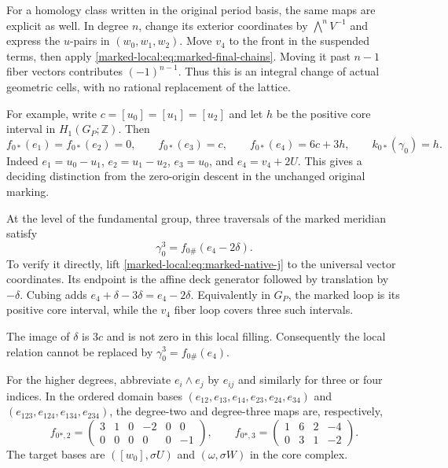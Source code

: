For a homology class written in the original period basis, the
same maps are explicit as well. In degree $n$, change its exterior coordinates by $\bigwedge^nV^{-1}$
and express the $u$-pairs in $(w_0,w_1,w_2)$.
Move $v_4$ to the front in the suspended terms, then apply
\eqref{marked-local:eq:marked-final-chains}. Moving it
past $n-1$ fiber vectors contributes $(-1)^{n-1}$.
Thus this is an integral change of actual geometric
cells, with no rational replacement of the lattice.

For example, write $c=[u_0]=[u_1]=[u_2]$ and let $h$ be the
positive core interval in $H_1(G_P;\mathbb Z)$. Then
\begin{equation}\label{marked-local:eq:marked-degree-one}
 f_{0*}(e_1)=f_{0*}(e_2)=0,\qquad
 f_{0*}(e_3)=c,\qquad f_{0*}(e_4)=6c+3h,
 \qquad k_{0*}(\gamma_0)=h.
\end{equation}
Indeed $e_1=u_0-u_1$, $e_2=u_1-u_2$, $e_3=u_0$,
and $e_4=v_4+2U$. This gives a deciding distinction from the
zero-origin descent in the unchanged original marking.

At the level of the fundamental group, three traversals of
the marked meridian satisfy
\begin{equation}\label{marked-local:eq:marked-meridian-relation}
                   \gamma_0^3=f_{0\#}(e_4-2\delta).
\end{equation}
To verify it directly, lift \eqref{marked-local:eq:marked-native-j} to the
universal vector coordinates. Its endpoint is the affine deck
generator followed by translation by $-\delta$. Cubing adds
$e_4+\delta-3\delta=e_4-2\delta$. Equivalently in $G_P$, the
marked loop is its positive core interval, while the $v_4$ fiber
loop covers three such intervals.

The image of $\delta$ is
$3c$ and is not zero in this local filling. Consequently the
local relation cannot be replaced by $\gamma_0^3=f_{0\#}(e_4)$.

For the higher degrees, abbreviate $e_i\wedge e_j$ by $e_{ij}$
and similarly for three or four indices. In the ordered domain
bases $(e_{12},e_{13},e_{14},e_{23},e_{24},e_{34})$ and
$(e_{123},e_{124},e_{134},e_{234})$, the degree-two and
degree-three maps are, respectively,
\begin{equation}\label{marked-local:eq:marked-higher-matrices}
 f_{0*,2}=\begin{pmatrix}3&1&0&-2&0&0\\0&0&0&0&0&-1\end{pmatrix},
 \qquad
 f_{0*,3}=\begin{pmatrix}1&6&2&-4\\0&3&1&-2\end{pmatrix}.
\end{equation}
The target bases are $([w_0],\sigma U)$ and
$(\omega,\sigma W)$ in the core complex.

